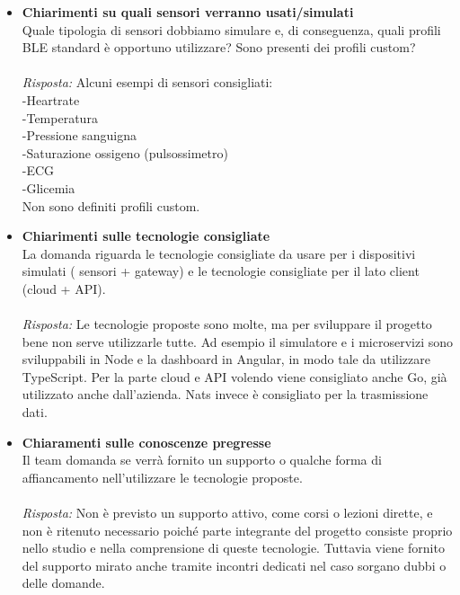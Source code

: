 \documentclass[a4paper,12pt]{article}
\begin{document}
\begin{itemize}
    \item \textbf{Chiarimenti su quali sensori verranno usati/simulati} \\
    \noindent
    Quale tipologia di sensori dobbiamo simulare e, di conseguenza, quali profili BLE standard è opportuno utilizzare? Sono presenti dei profili custom?\\ \\
    \textit{Risposta:} 
    Alcuni esempi di sensori consigliati: \\ 
    -Heartrate \\
    -Temperatura \\
    -Pressione sanguigna \\
    -Saturazione ossigeno (pulsossimetro) \\
    -ECG \\ 
    -Glicemia \\
    Non sono definiti profili custom.
    \vspace{1cm}
    
     \item \textbf{Chiarimenti sulle tecnologie consigliate}\\
    \noindent
    La domanda riguarda le tecnologie consigliate da usare per i dispositivi simulati ( sensori + gateway) e le tecnologie consigliate per il lato client (cloud + API).\\ \\
    \textit{Risposta:} 
    Le tecnologie proposte sono molte, ma per sviluppare il progetto bene non serve utilizzarle tutte. Ad esempio il simulatore e i microservizi sono sviluppabili in Node e la dashboard in Angular, in modo tale da utilizzare TypeScript. Per la parte cloud e API volendo viene consigliato anche Go, già utilizzato anche dall'azienda. Nats invece è consigliato per la trasmissione dati.
    \vspace{1cm}

    \item \textbf{Chiaramenti sulle conoscenze pregresse}\\
    \noindent
    Il team domanda se verrà fornito un supporto o qualche forma di affiancamento nell'utilizzare le tecnologie proposte.\\ \\
    \textit{Risposta:} 
    Non è previsto un supporto attivo, come corsi o lezioni dirette, e non è ritenuto necessario poiché parte integrante del progetto consiste proprio nello studio e nella comprensione di queste tecnologie. Tuttavia viene fornito del supporto mirato anche tramite incontri dedicati nel caso sorgano dubbi o delle domande. 
    \vspace{1cm}
    

\end{itemize}
\end{document}
